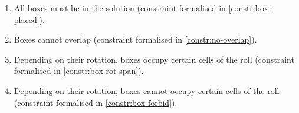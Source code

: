 \begin{enumerate}
    \item All boxes must be in the solution (constraint formalised in
    \ref{constr:box-placed}).
    
    
    \item Boxes cannot overlap (constraint formalised in \ref{constr:no-overlap}).
    
    
    \item Depending on their rotation, boxes occupy certain cells of the roll
    (constraint formalised in \ref{constr:box-rot-span}).
    
    
    \item Depending on their rotation, boxes cannot occupy certain cells of the
    roll (constraint formalised in \ref{constr:box-forbid}).
    
\end{enumerate}